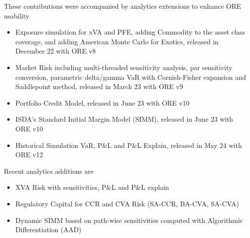These contributions were accompanied by analytics extensions to enhance ORE usability
\begin{itemize}
\item Exposure simulation for xVA and PFE, adding Commodity to the asset class coverage, and adding American Monte Carlo for Exotics, released in December 22 with ORE v8
\item Market Risk including multi-threaded sensitivity analysis, par sensitivity conversion, parametric delta/gamma VaR with Cornish-Fisher expansion and Saddlepoint method, released in March 23 with ORE v9
\item Portfolio Credit Model, released in June 23 with ORE v10
\item ISDA's Standard Initial Margin Model (SIMM), released in June 23 with ORE v10
\item Historical Simulation VaR, P\&L and P\&L Explain, released in May 24 with ORE v12
\end{itemize}

Recent analytics additions are
\begin{itemize}
\item XVA Risk with sensitivities, P\&L and P\&L explain
\item Regulatory Capital for CCR and CVA Risk (SA-CCR, BA-CVA, SA-CVA)
\item Dynamic SIMM based on path-wise sensitivities computed with Algorithmic Differentiation (AAD)
\end{itemize}

